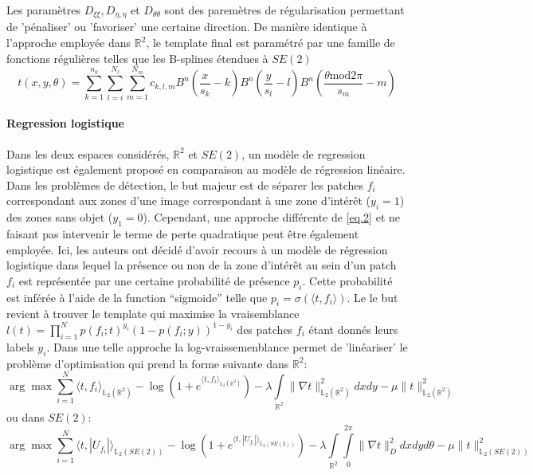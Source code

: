 \documentclass{article}
\begin{document}
Les paramètres $D_{\xi \xi}, D_{\eta, \eta}$ et $D_{\theta \theta}$ sont des paremètres de régularisation permettant de 'pénaliser' ou 'favoriser' une certaine direction.
De manière identique à l'approche employée dans $\mathbb{R}^2$, le template final est paramétré par une famille de fonctions
régulières telles que les B-splines étendues à $SE(2)$
\[
    t(x, y, \theta) = \sum \limits_{k=1}^{n_k} \sum \limits_{l=i}^{N_l} \sum \limits_{m=1}^{N_m} c_{k,l,m} B^n \left (\frac{x}{s_k} - k \right )
    B^n \left (\frac{y}{s_l} - l \right) B^n \left (\frac{\theta \text{mod} 2\pi}{s_m} - m \right )
\]

\paragraph{Regression logistique}
Dans les deux espaces considérés, $\mathbb{R}^2$ et $SE(2)$, un modèle de regression logistique est également proposé en comparaison 
au modèle de régression linéaire. Dans les problèmes de détection, le but majeur est de séparer les patches $f_i$ correspondant aux zones d'une image correspondant à une 
zone d'intérêt ($y_i =1$) des zones sans objet ($y_1=0$). Cependant, une approche différente de \ref{eq.2} et ne faisant pas intervenir le terme de perte quadratique 
peut être également employée. Ici, les auteurs ont décidé d'avoir recours à un modèle de régression logistique dans lequel la présence ou non de 
la zone d'intérêt au sein d'un patch $f_i$ est représentée par une certaine probabilité de présence $p_i$. Cette probabilité est inférée à l'aide de
la function ``sigmoide'' telle que $p_i = \sigma(\langle t, f_i \rangle)$. Le le but revient à trouver le template qui maximise la vraisemblance $l(t) = 
\prod \limits_{i=1}^N p(f_i; t)^{y_i}(1 - p(f_i; y))^{1- y_i}$
des patches $f_i$ étant donnés leurs labels $y_i$. Dans une telle approche la log-vraissemenblance permet de 'linéariser' le problème d'optimisation qui prend la forme
suivante dans $\mathbb{R}^2$:
\[
    \arg \max \sum \limits_{i=1}^N \langle t, f_i \rangle_{\mathbb{L}_2(\mathbb{R}^2)} - \log \left ( 1 + e^{\langle t, f_i \rangle_{\mathbb{L}_2(\mathbb{R}^2)}}\right) - \lambda \int \limits_{\mathbb{R}^2} \lVert \nabla 
    t \rVert_{\mathbb{L}_2(\mathbb{R}^2)}^2 dx dy - \mu \lVert t \rVert_{\mathbb{L}_2(\mathbb{R}^2)}^2
\]
ou dans $SE(2)$:
\[
    \arg \max \sum \limits_{i=1}^N \langle t, |U_{f_i}| \rangle_{\mathbb{L}_2(SE(2))} - \log \left ( 1 + e^{\langle t, |U_{f_i}| \rangle_{\mathbb{L}_2(SE(2))}}\right) - \lambda \int \limits_{\mathbb{R}^2} \int \limits_{0}^{2\pi}\lVert \nabla 
    t \rVert_{D}^2 dx dy d\theta- \mu \lVert t \rVert_{\mathbb{L}_2(SE(2))}^2
\]
\end{document}
